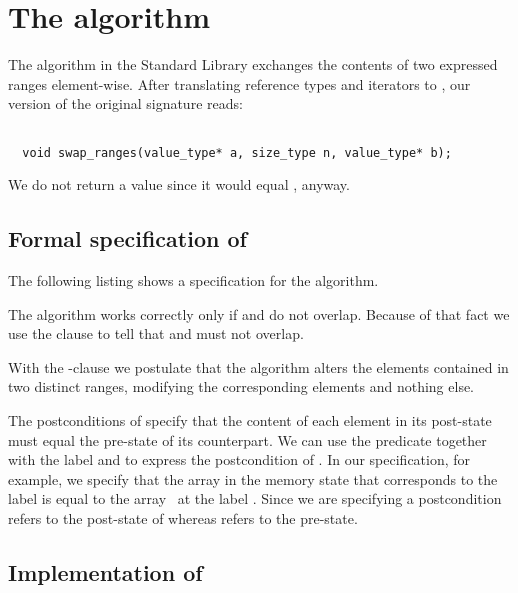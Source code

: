 
\section{The \swapranges algorithm}

The \swapranges algorithm
in the \cxx Standard Library \cite[\S 28.6.3]{cxx-17-draft} exchanges the
contents of two expressed ranges element-wise.
%
After translating \cxx reference types and iterators to \isoc,
our version of the original signature reads:

\begin{lstlisting}[style=acsl-block]

  void swap_ranges(value_type* a, size_type n, value_type* b);
\end{lstlisting} 
%
We do not return a value since it would equal , anyway.


\subsection{Formal specification of \swapranges}

The following listing shows a specification for the  algorithm.



The \swapranges algorithm works correctly only if  and  do not overlap.
Because of that fact we use the clause  to
tell \framac that  and  must not overlap.

With the -clause we postulate
that the \swapranges algorithm alters the elements contained
in two distinct ranges, modifying the corresponding
elements and nothing else.

The postconditions of \swapranges specify that the content
of each element in its post-state must equal the pre-state
of its counterpart.
We can use the predicate  together with the
label  and  to express the postcondition of \swapranges.
In our specification, for example, we specify that the array  in the memory
state that corresponds to the label  is equal
to the array~ at the label .
Since we are specifying a postcondition  refers to the post-state
of \swapranges whereas  refers to the pre-state.

\clearpage

\subsection{Implementation of \swapranges}

